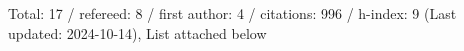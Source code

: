 Total: 17 / refereed: 8 / first author: 4 / citations: 996 / h-index: 9 (Last updated: 2024-10-14), List attached below